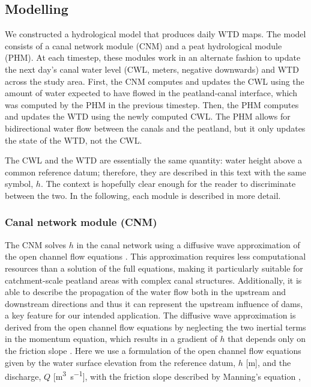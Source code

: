\documentclass[bg, manuscript]{copernicus}
\begin{document}
    
\subsection{Modelling}
We constructed a hydrological model that produces daily WTD maps.
The model consists of a canal network module (CNM) and a peat hydrological module (PHM).
At each timestep, these modules work in an alternate fashion to update the next day’s canal water level (CWL, meters, negative downwards) and WTD across the study area.
First, the CNM computes and updates the CWL using the amount of water expected to have flowed in the peatland-canal interface, which was computed by the PHM in the previous timestep.
Then, the PHM computes and updates the WTD using the newly computed CWL.
The PHM allows for bidirectional water flow between the canals and the peatland, but it only updates the state of the WTD, not the CWL.

The CWL and the WTD are essentially the same quantity: water height above a common reference datum; therefore, they are described in this text with the same symbol, $h$.
The context is hopefully clear enough for the reader to discriminate between the two.
In the following, each module is described in more detail.

\subsubsection{Canal network module (CNM)}
The CNM solves $h$ in the canal network using a diffusive wave approximation of the open channel flow equations \citep{szymkiewiczNumericalModelingOpen2010}.
This approximation requires less computational resources than a solution of the full equations, making it particularly suitable for catchment-scale peatland areas with complex canal structures.
Additionally, it is able to describe the propagation of the water flow both in the upstream and downstream directions and thus it can represent the  upstream influence of dams, a key feature for our intended application.
The diffusive wave approximation is derived from the open channel flow equations by neglecting the two inertial terms in the momentum equation, which results in a gradient of $h$ that depends only on the friction slope \citep{novakHydraulicModellingIntroduction2010}.
Here we use a formulation of the open channel flow equations given by the water surface elevation from the reference datum, $h$ [\unit{m}], and the discharge, $Q$ [\unit{m^3s^{-1}}], with the friction slope described by Manning's equation \citep{cungePracticalAspectsComputational1980},
\end{document}
